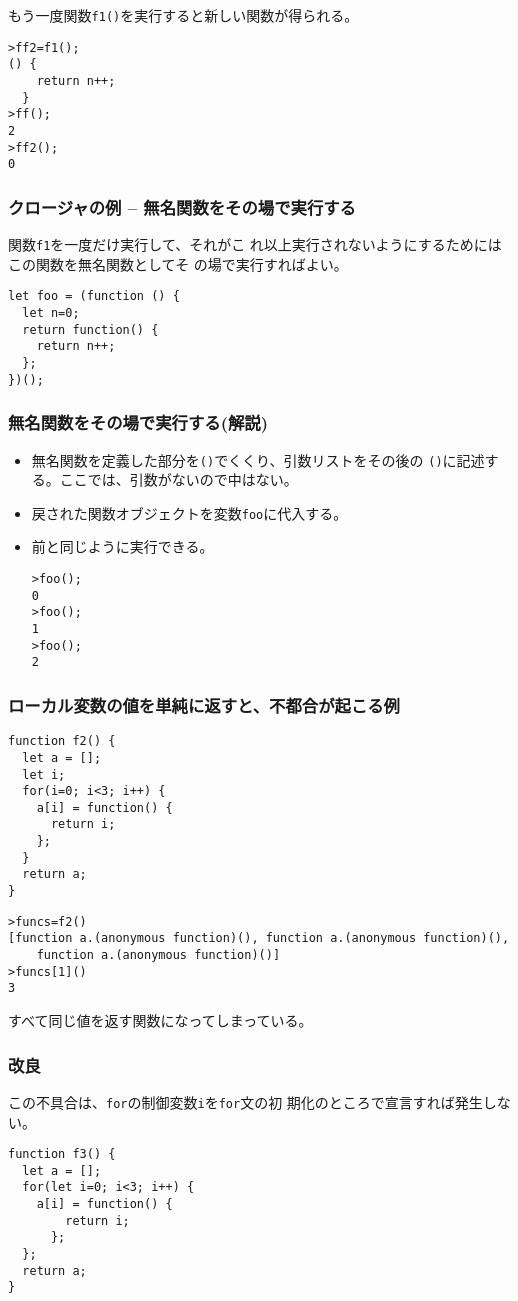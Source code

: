 \begin{frame}[containsverbatim]
 もう一度関数\texttt{f1()}を実行すると新しい関数が得られる。
\begin{Verbatim}
>ff2=f1();
() {
    return n++;
  }
>ff();
2
>ff2();
0
\end{Verbatim}
\end{frame}
\begin{frame}[containsverbatim]
\frametitle{クロージャの例 -- 無名関数をその場で実行する}
関数\texttt{f1}を一度だけ実行して、それがこ
        れ以上実行されないようにするためにはこの関数を無名関数としてそ
 の場で実行すればよい。
\begin{Verbatim}
let foo = (function () {
  let n=0;
  return function() {
    return n++;
  };
})();
\end{Verbatim}
\end{frame}
\begin{frame}[containsverbatim]
\frametitle{無名関数をその場で実行する(解説)}
\begin{itemize}
 \item 無名関数を定義した部分を\texttt{()}でくくり、引数リストをその後の
       \texttt{()}に記述する。ここでは、引数がないので中はない。
   \item 戻された関数オブジェクトを変数\texttt{foo}に代入する。
  \item 前と同じように実行できる。
\begin{Verbatim}
>foo();
0
>foo();
1
>foo();
2
\end{Verbatim}
\end{itemize}
\end{frame}
\begin{frame}[containsverbatim]
\frametitle{ローカル変数の値を単純に返すと、不都合が起こる例}
\begin{Verbatim}
function f2() {
  let a = [];
  let i;
  for(i=0; i<3; i++) {
    a[i] = function() {
      return i;
    };
  }
  return a;
}
\end{Verbatim}
\begin{Verbatim}
>funcs=f2()
[function a.(anonymous function)(), function a.(anonymous function)(),
    function a.(anonymous function)()]
>funcs[1]()
3
\end{Verbatim}
すべて同じ値を返す関数になってしまっている。
\end{frame}
\begin{frame}[containsverbatim]
\frametitle{改良}
この不具合は、\texttt{for}の制御変数\Verb+i+を\Verb+for+文の初
 期化のところで宣言すれば発生しない。
\begin{Verbatim}
function f3() {
  let a = [];
  for(let i=0; i<3; i++) {
    a[i] = function() {
        return i;
      };
  };
  return a;
}
\end{Verbatim}
\end{frame}
